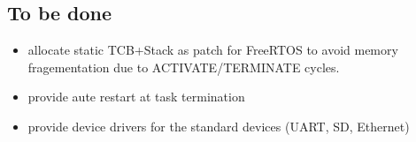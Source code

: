 \subsection{To be done}
  \begin{itemize}
  \item allocate static TCB+Stack as patch for FreeRTOS to avoid 
    memory fragementation due to ACTIVATE/TERMINATE cycles.
  \item provide aute restart at task termination
  \item provide device drivers for the standard devices (UART, SD, Ethernet)

  \end{itemize}


